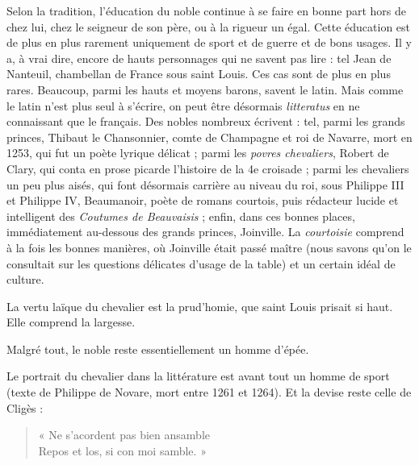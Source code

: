 \documentclass[french,twoside]{book} %
\newcommand{\labelchar}[1]{{\color{rubric}\bf #1}}
\begin{document}
\bigbreak
\noindent \labelchar{c) La vie noble.}\par
Selon la tradition, l’éducation du noble continue à se faire en bonne part hors de chez lui, chez le seigneur de son père, ou à la rigueur un égal. Cette éducation est de plus en plus rarement uniquement de sport et de guerre et de bons usages. Il y a, à vrai dire, encore de hauts personnages qui ne savent pas lire : tel Jean de Nanteuil, chambellan de France sous saint Louis. Ces cas sont de plus en plus rares. Beaucoup, parmi les hauts et moyens barons, savent le latin. Mais comme le latin n’est plus seul à s’écrire, on peut être désormais \emph{litteratus} en ne connaissant que le français. Des nobles nombreux écrivent : tel, parmi les grands princes, Thibaut le Chansonnier, comte de Champagne et roi de Navarre, mort en 1253, qui fut un poète lyrique délicat ; parmi les \emph{povres chevaliers}, Robert de Clary, qui conta en prose picarde l’histoire de la 4e croisade ; parmi les chevaliers un peu plus aisés, qui font désormais carrière au niveau du roi, sous Philippe III et Philippe IV, Beaumanoir, poète de romans courtois, puis rédacteur lucide et intelligent des {\itshape Coutumes de Beauvaisis} ; enfin, dans ces bonnes places, immédiatement au-dessous des grands princes, Joinville. La \emph{courtoisie} comprend à la fois les bonnes manières, où Joinville était passé maître (nous savons qu’on le consultait sur les questions délicates d’usage de la table) et un certain idéal de culture.\par
\label{p69} La vertu laïque du chevalier est la prud’homie, que saint Louis prisait si haut. Elle comprend la largesse.\par
Malgré tout, le noble reste essentiellement un homme d’épée.\par
Le portrait du chevalier dans la littérature est avant tout un homme de sport (texte de Philippe de Novare, mort entre 1261 et 1264). Et la devise reste celle de Cligès :\par


\begin{verse}
« Ne s’acordent pas bien ansamble\\
Repos et los, si con moi samble. »\\
\end{verse}
\end{document}

